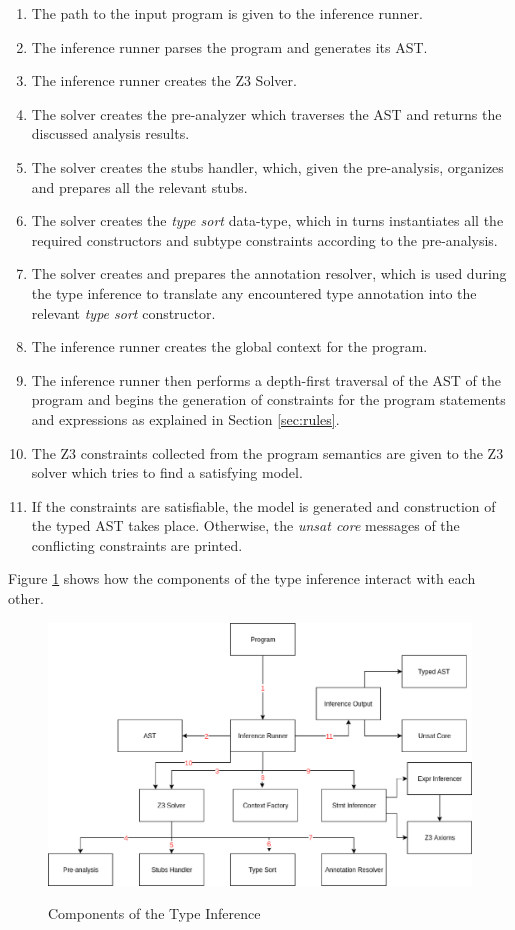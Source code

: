 \begin{enumerate}
	\item The path to the input program is given to the inference runner.
	\item The inference runner parses the program and generates its AST.
	\item The inference runner creates the Z3 Solver.
	\item The solver creates the pre-analyzer which traverses the AST and returns the discussed analysis results.
	\item The solver creates the stubs handler, which, given the pre-analysis, organizes and prepares all the relevant stubs.
	\item The solver creates the \textit{type sort} data-type, which in turns instantiates all the required constructors and subtype constraints according to the pre-analysis.
	\item The solver creates and prepares the annotation resolver, which is used during the type inference to translate any encountered type annotation into the relevant \textit{type sort} constructor.
	\item The inference runner creates the global context for the program.
	\item The inference runner then performs a depth-first traversal of the AST of the program and begins the generation of constraints for the program statements and expressions as explained in Section \ref{sec:rules}.
	\item The Z3 constraints collected from the program semantics are given to the Z3 solver which tries to find a satisfying model.
	\item If the constraints are satisfiable, the model is generated and construction of the typed AST takes place. Otherwise, the \textit{unsat core} messages of the conflicting constraints are printed.
\end{enumerate}
Figure \ref{fig:ti_comp} shows how the components of the type inference interact with each other.

\begin{figure}
	\centering
	\begin{mdframed}
		\centering
		\includegraphics[width=130mm]{images/TI_comp.eps}\\
	\end{mdframed}
	\caption{Components of the Type Inference}
	\label{fig:ti_comp}
\end{figure}

